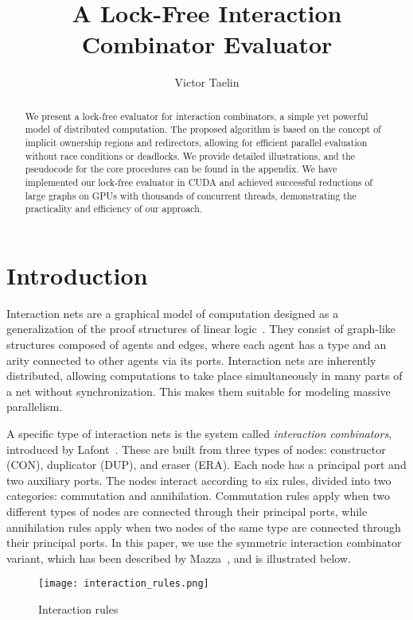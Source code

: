 \documentclass{article}
\title{A Lock-Free Interaction Combinator Evaluator}
\author{Victor Taelin}
\date{}
\begin{document}
\maketitle

\begin{abstract}
We present a lock-free evaluator for interaction combinators, a simple yet powerful model of distributed computation. The proposed algorithm is based on the concept of implicit ownership regions and redirectors, allowing for efficient parallel evaluation without race conditions or deadlocks. We provide detailed illustrations, and the pseudocode for the core procedures can be found in the appendix. We have implemented our lock-free evaluator in CUDA and achieved successful reductions of large graphs on GPUs with thousands of concurrent threads, demonstrating the practicality and efficiency of our approach.
\end{abstract}

\section{Introduction}\label{s:introduction}

Interaction nets are a graphical model of computation designed as a generalization of the proof structures of linear logic~\cite{girard1987linear}. They consist of graph-like structures composed of agents and edges, where each agent has a type and an arity connected to other agents via its ports. Interaction nets are inherently distributed, allowing computations to take place simultaneously in many parts of a net without synchronization. This makes them suitable for modeling massive parallelism.

A specific type of interaction nets is the system called \textit{interaction combinators}, introduced by Lafont~\cite{lafont1997interaction}. These are built from three types of nodes: constructor (CON), duplicator (DUP), and eraser (ERA). Each node has a principal port and two auxiliary ports. The nodes interact according to six rules, divided into two categories: commutation and annihilation. Commutation rules apply when two different types of nodes are connected through their principal ports, while annihilation rules apply when two nodes of the same type are connected through their principal ports. In this paper, we use the symmetric interaction combinator variant, which has been described by Mazza~\cite{mazza2007denotational}, and is illustrated below.

\begin{figure}[h!]
\centering
\texttt{[image: interaction\_rules.png]}
\caption{Interaction rules}
\end{figure}
\end{document}
